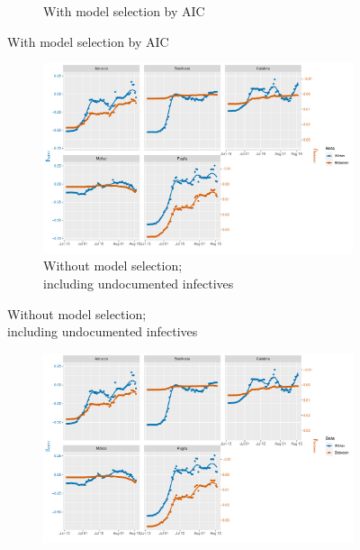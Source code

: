 \documentclass[12pt]{article}
\begin{document}
\begin{appendices}
\begin{figure}[H]
\begin{subfigure}{\textwidth}
    	      \caption{With model selection by AIC}
    	      \label{fig:beta_between_over_time_sud_aic}
    	    \end{subfigure}
    	\end{figure}
        \begin{figure}[H]\ContinuedFloat
    	    \begin{subfigure}{\textwidth}
    	      \centering
    	      \includegraphics[width=\linewidth]{output/model_between_lag14_betas_Sud_UndocQuadratic_rolling.pdf}
    	      \caption{Without model selection; \\ including undocumented infectives}
    	      \label{fig:beta_between_over_time_sud_regular_undoc}
    	    \end{subfigure}
        \end{figure}
        \begin{figure}[H]\ContinuedFloat
    	    \begin{subfigure}{\textwidth}
    	      \centering
    	      \includegraphics[width=\linewidth]{output/model_between_lag14_betas_Sud_aic_UndocQuadratic_rolling.pdf}

\end{subfigure}
\end{figure}
\end{appendices}
\end{document}
